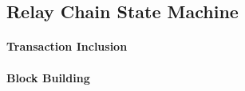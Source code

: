\subsection{Relay Chain State Machine}

 \paragraph{Transaction Inclusion}

 \paragraph{Block Building}
